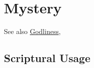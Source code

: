 \section{Mystery}
	\label{MYSTERY}
	
	See also \hyperref[GODLINESS]{Godliness},
	





\subsection{Scriptural Usage} %
	\label{MYSTERY-SCRIPTURES}

	
	
